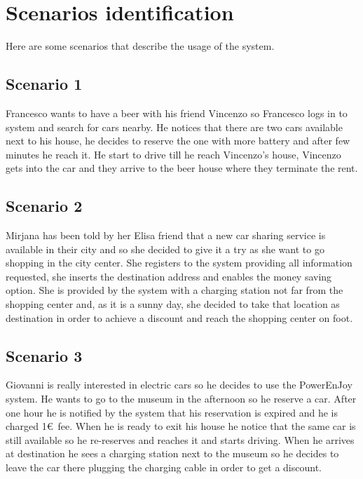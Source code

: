 \section{Scenarios identification}
Here are some scenarios that describe the usage of the system.
\subsection{Scenario 1}
\label{scenario:1}
Francesco wants to have a beer with his friend Vincenzo so Francesco logs in to system and search for cars nearby. He notices that there are two cars available next to his house, he decides to reserve the one with more battery and after few minutes he reach it. He start to drive till he reach Vincenzo's house, Vincenzo gets into the car and they arrive to the beer house where they terminate the rent.

\subsection{Scenario 2}
\label{scenario:2}
Mirjana has been told by her Elisa friend that a new car sharing service is available in their city and so she decided to give it a try as she want to go shopping in the city center. She registers to the system providing all information requested, she inserts the destination address and enables the money saving option. She is provided by the system with a charging station not far from the shopping center and, as it is a sunny day, she decided to take that location as destination in order to achieve a discount and reach the shopping center on foot. 

\subsection{Scenario 3}
\label{scenario:3}
Giovanni is really interested in electric cars so he decides to use the PowerEnJoy system. He wants to go to the museum in the afternoon so he reserve a car. After one hour he is notified by the system that his reservation is expired and he is charged 1\euro\ fee. When he is ready to exit his house he notice that the same car is still available so he re-reserves and reaches it and starts driving. When he arrives at destination he sees a charging station next to the museum so he decides to leave the car there plugging the charging cable in order to get a discount.
